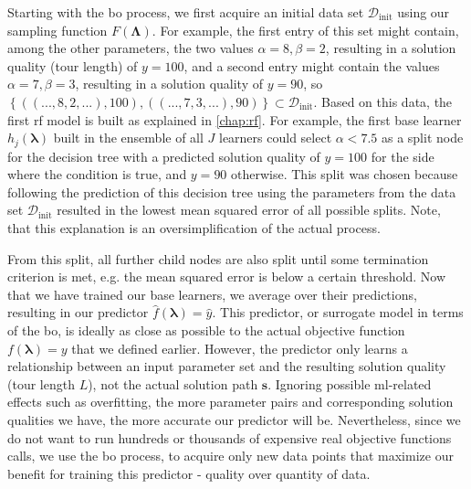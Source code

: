 Starting with the \gls{bo} process, we first acquire an initial data set $\mathcal{D}_\text{init}$ using our sampling function $F(\mathbf{\Lambda})$. For example, the first entry of this set might contain, among the other parameters, the two values $\alpha = 8, \beta = 2$, resulting in a solution quality (tour length) of $y = 100$, and a second entry might contain the values $\alpha = 7, \beta = 3$, resulting in a solution quality of $y=90$, so $\left\lbrace ((...,8,2,...), 100), ((...,7,3,...), 90) \right\rbrace \subset \mathcal{D}_\text{init}$. Based on this data, the first \gls{rf} model is built as explained in \cref{chap:rf}. For example, the first base learner $h_j(\mathbf{\lambda})$ built in the ensemble of all $J$ learners could select $\alpha < 7.5$ as a split node for the decision tree with a predicted solution quality of $y=100$ for the side where the condition is true, and $y=90$ otherwise. This split was chosen because following the prediction of this decision tree using the parameters from the data set $\mathcal{D}_\text{init}$ resulted in the lowest mean squared error of all possible splits. Note, that this explanation is an oversimplification of the actual process. 

From this split, all further child nodes are also split until some termination criterion is met, e.g. the mean squared error is below a certain threshold. Now that we have trained our base learners, we average over their predictions, resulting in our predictor $\hat{f}(\mathbf{\lambda}) = \hat{y}$. This predictor, or surrogate model in terms of the \gls{bo}, is ideally as close as possible to the actual objective function $f(\mathbf{\lambda}) = y$ that we defined earlier. However, the predictor only learns a relationship between an input parameter set and the resulting solution quality (tour length $L$), not the actual solution path $\mathbf{s}$. Ignoring possible \gls{ml}-related effects such as overfitting, the more parameter pairs and corresponding solution qualities we have, the more accurate our predictor will be. Nevertheless, since we do not want to run hundreds or thousands of expensive real objective functions calls, we use the \gls{bo} process, to acquire only new data points that maximize our benefit for training this predictor - quality over quantity of data.

